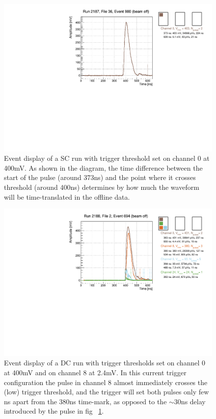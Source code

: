 \documentclass[12pt]{article}
\begin{document}
\begin{figure}[h]
\centering
\centerline{\includegraphics[scale=0.7]{figures/triggerEfficiency/Run2187_File36_Event980_Franny}}
{\caption{ Event display of a SC run with trigger threshold set on channel 0 at 400mV. As shown in the diagram, the time difference between the start of the pulse (around 373ns) and the point where it crosses threshold (around 400ns) determines by how much the waveform will be time-translated in the offline data. }

\label{fig:SC_run}
}
\end{figure}

\begin{figure}[h]
\centering
\centerline{\includegraphics[scale=0.7]{figures/triggerEfficiency/Run2188_File2_Event694_Franny}}
{\caption{ Event display of a DC run with trigger thresholds set on channel 0 at 400mV and on channel 8 at 2.4mV. In this current trigger configuration the pulse in channel 8 almost immediately crosses the (low) trigger threshold, and the trigger will set both pulses only few ns apart from the 380ns time-mark, as opposed to the $\sim30$ns delay introduced by the pulse in fig ~\ref{fig:SC_run}.  }

\label{fig:DC_run}
}
\end{figure}
\end{document}
